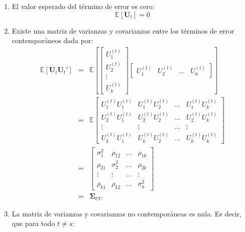 \documentclass[
]{book}
\begin{document}
\begin{enumerate}
\def\labelenumi{\arabic{enumi}.}
\item
  El valor esperado del término de error es cero: \begin{equation}
     \mathbb{E}[\mathbf{U}_t] = 0
    \end{equation}
\item
  Existe una matriz de varianzas y covarianzas entre los términos de
  error contemporáneos dada por:
  \begin{eqnarray}
     \mathbb{E}[\mathbf{U}_t \mathbf{U}_t'] 
     & = &
     \mathbb{E} \left[
     \begin{bmatrix}
     U^{(t)}_{1} \\ U^{(t)}_{2} \\ \vdots \\ U^{(t)}_{k}
     \end{bmatrix}
     \begin{bmatrix}
     U^{(t)}_{1} & U^{(t)}_{2} & \ldots & U^{(t)}_{k}
     \end{bmatrix}
     \right] \nonumber \\
     & = & \mathbb{E}
     \begin{bmatrix}
     U^{(t)}_{1} U^{(t)}_{1} & U^{(t)}_{1} U^{(t)}_{2} & \ldots & U^{(t)}_{1} U^{(t)}_{k} \\
     U^{(t)}_{2} U^{(t)}_{1} & U^{(t)}_{2} U^{(t)}_{2} & \ldots & U^{(t)}_{2} U^{(t)}_{k} \\
     \vdots & \vdots & \ldots & \vdots \\
     U^{(t)}_{k} U^{(t)}_{1} & U^{(t)}_{k} U^{(t)}_{2} & \ldots & U^{(t)}_{k} U^{(t)}_{k}
     \end{bmatrix} \nonumber \\
     & = & \begin{bmatrix}
     \sigma^2_1 & \rho_{12} & \ldots & \rho_{1k} \\
     \rho_{21} & \sigma^2_2 & \ldots & \rho_{2k} \\
     \vdots & \vdots & \ldots & \vdots \\
     \rho_{k1} & \rho_{k2} & \ldots & \sigma^2_k
     \end{bmatrix} \nonumber \\
     & = & \mathbf{\Sigma}_{UU}
     \label{eq:SigmaVAR}
    \end{eqnarray}
\item
  La matriz de varianzas y covarianzas no contemporáneas es nula. Es
  decir, que para todo \(t \neq s\):
  \begin{eqnarray}

\end{eqnarray}
\end{enumerate}
\end{document}
